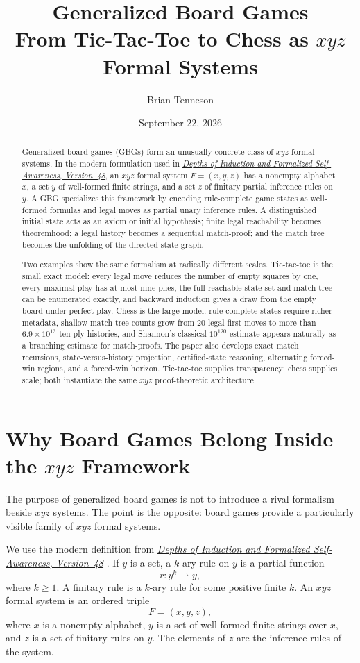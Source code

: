 \documentclass[11pt]{article}
\title{\textbf{Generalized Board Games}\\[0.45em]
\large From Tic-Tac-Toe to Chess as $xyz$ Formal Systems}
\author{Brian Tenneson}
\date{September 22, 2026}
\theoremstyle{definition}
\theoremstyle{remark}
\newcommand{\DepthsRef}{\href{https://btenneson.github.io/pub/cs.LO_Logic_in_Computer_Science/depths_of_induction_v48/}{\emph{Depths of Induction and Formalized Self-Awareness, \mbox{Version~48}}}}
\begin{document}
\maketitle

\begin{abstract}
Generalized board games (GBGs) form an unusually concrete class of $xyz$ formal systems. In the modern formulation used in \DepthsRef{}, an $xyz$ formal system $F=(x,y,z)$ has a nonempty alphabet $x$, a set $y$ of well-formed finite strings, and a set $z$ of finitary partial inference rules on $y$. A GBG specializes this framework by encoding rule-complete game states as well-formed formulas and legal moves as partial unary inference rules. A distinguished initial state acts as an axiom or initial hypothesis; finite legal reachability becomes theoremhood; a legal history becomes a sequential match-proof; and the match tree becomes the unfolding of the directed state graph.

Two examples show the same formalism at radically different scales. Tic-tac-toe is the small exact model: every legal move reduces the number of empty squares by one, every maximal play has at most nine plies, the full reachable state set and match tree can be enumerated exactly, and backward induction gives a draw from the empty board under perfect play. Chess is the large model: rule-complete states require richer metadata, shallow match-tree counts grow from $20$ legal first moves to more than $6.9\times10^{13}$ ten-ply histories, and Shannon's classical $10^{120}$ estimate appears naturally as a branching estimate for match-proofs. The paper also develops exact match recursions, state-versus-history projection, certified-state reasoning, alternating forced-win regions, and a forced-win horizon. Tic-tac-toe supplies transparency; chess supplies scale; both instantiate the same $xyz$ proof-theoretic architecture.
\end{abstract}

\section{Why Board Games Belong Inside the \texorpdfstring{$xyz$}{xyz} Framework}

The purpose of generalized board games is not to introduce a rival formalism beside $xyz$ systems. The point is the opposite: board games provide a particularly visible family of $xyz$ formal systems.

We use the modern definition from \DepthsRef{} \cite{Tenneson2026}. If $y$ is a set, a $k$-ary rule on $y$ is a partial function
\[
r:y^k\rightharpoonup y,
\]
where $k\ge 1$. A finitary rule is a $k$-ary rule for some positive finite $k$. An $xyz$ formal system is an ordered triple
\[
F=(x,y,z),
\]
where $x$ is a nonempty alphabet, $y$ is a set of well-formed finite strings over $x$, and $z$ is a set of finitary rules on $y$. The elements of $z$ are the inference rules of the system.
\end{document}
